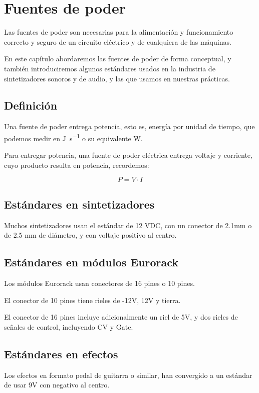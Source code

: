 \documentclass[../principal.tex]{subfiles}
\begin{document}
\chapter{Fuentes de poder}

Las fuentes de poder son necesarias para la alimentación y funcionamiento correcto y seguro de un circuito eléctrico y de cualquiera de las máquinas.

En este capítulo abordaremos las fuentes de poder de forma conceptual, y también introduciremos algunos estándares usados en la industria de sintetizadores sonoros y de audio, y las que usamos en nuestras prácticas.

\section{Definición}

Una fuente de poder entrega potencia, esto es, energía por unidad de tiempo, que podemos medir en \unit{\joule\per\second} o su equivalente \unit{\watt}.

Para entregar potencia, una fuente de poder eléctrica entrega voltaje y corriente, cuyo producto resulta en potencia, recordemos:

\begin{equation}
P = V \cdot I
\end{equation}

\section{Estándares en sintetizadores}

Muchos sintetizadores usan el estándar de 12 VDC, con un conector de 2.1mm o de 2.5 mm de diámetro, y con voltaje positivo al centro.

\section{Estándares en módulos Eurorack}

Los módulos Eurorack usan conectores de 16 pines o 10 pines.

El conector de 10 pines tiene rieles de -12V, 12V y tierra.

El conector de 16 pines incluye adicionalmente un riel de 5V, y dos rieles de señales de control, incluyendo CV y Gate.

\section{Estándares en efectos}

Los efectos en formato pedal de guitarra o similar, han convergido a un estándar de usar 9V con negativo al centro.
\end{document}

